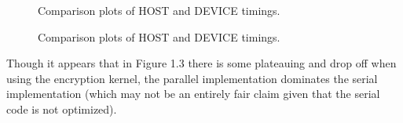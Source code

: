 \begin{figure}[!ht]\centering
{}
\caption{Comparison plots of HOST and DEVICE timings.}
\label{fig}
\end{figure}

\begin{figure}[!ht]\centering
{}
\caption{Comparison plots of HOST and DEVICE timings.}
\label{fig}
\end{figure}

Though it appears that in Figure 1.3 there is some plateauing and drop off when using the encryption kernel, the parallel implementation dominates the serial implementation (which may not be an entirely fair claim given that the serial code is not optimized).

